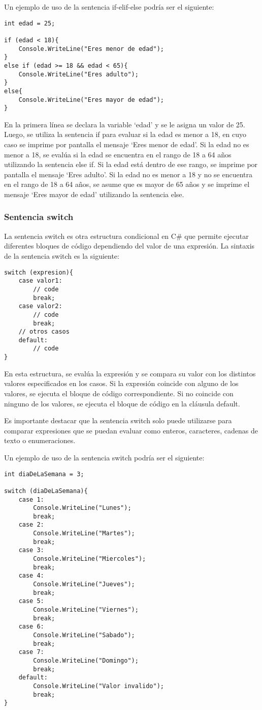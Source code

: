\documentclass[executivepaper]{article}
\begin{document}
Un ejemplo de uso de la sentencia if-elif-else podría ser el siguiente:
\begin{lstlisting}
int edad = 25;

if (edad < 18){
    Console.WriteLine("Eres menor de edad");
}
else if (edad >= 18 && edad < 65){
    Console.WriteLine("Eres adulto");
}
else{
    Console.WriteLine("Eres mayor de edad");
}
\end{lstlisting}
En la primera línea se declara la variable \enquote*{edad} y se le asigna un valor de 25. Luego, se utiliza la sentencia if para evaluar si la edad es menor a 18, en cuyo caso se imprime por pantalla el mensaje \enquote*{Eres menor de edad}. Si la edad no es menor a 18, se evalúa si la edad se encuentra en el rango de 18 a 64 años utilizando la sentencia else if. Si la edad está dentro de ese rango, se imprime por pantalla el mensaje \enquote*{Eres adulto}. Si la edad no es menor a 18 y no se encuentra en el rango de 18 a 64 años, se asume que es mayor de 65 años y se imprime el mensaje \enquote*{Eres mayor de edad} utilizando la sentencia else.

\subsubsection*{Sentencia switch}
La sentencia switch es otra estructura condicional en C\# que permite ejecutar diferentes bloques de código dependiendo del valor de una expresión. La sintaxis de la sentencia switch es la siguiente:
\begin{lstlisting}
switch (expresion){
    case valor1:
        // code
        break;
    case valor2:
        // code
        break;
    // otros casos
    default:
        // code
}
\end{lstlisting}
En esta estructura, se evalúa la expresión y se compara su valor con los distintos valores especificados en los casos. Si la expresión coincide con alguno de los valores, se ejecuta el bloque de código correspondiente. Si no coincide con ninguno de los valores, se ejecuta el bloque de código en la cláusula default.

Es importante destacar que la sentencia switch solo puede utilizarse para comparar expresiones que se puedan evaluar como enteros, caracteres, cadenas de texto o enumeraciones.

Un ejemplo de uso de la sentencia switch podría ser el siguiente:
\begin{lstlisting}
int diaDeLaSemana = 3;

switch (diaDeLaSemana){
    case 1:
        Console.WriteLine("Lunes");
        break;
    case 2:
        Console.WriteLine("Martes");
        break;
    case 3:
        Console.WriteLine("Miercoles");
        break;
    case 4:
        Console.WriteLine("Jueves");
        break;
    case 5:
        Console.WriteLine("Viernes");
        break;
    case 6:
        Console.WriteLine("Sabado");
        break;
    case 7:
        Console.WriteLine("Domingo");
        break;
    default:
        Console.WriteLine("Valor invalido");
        break;
}
\end{lstlisting}
\end{document}
